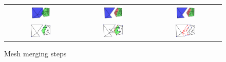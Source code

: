 \begin{figure}[t]
\begin{tabular}{ccc}
\includegraphics[width=0.3\textwidth]{./img/ch-incr-dens/meshmerge01}&
\includegraphics[width=0.3\textwidth]{./img/ch-incr-dens/meshmerge03}&
\includegraphics[width=0.3\textwidth]{./img/ch-incr-dens/meshmerge04}\\
\includegraphics[width=0.3\textwidth]{./img/ch-incr-dens/meshmerge07}&
\includegraphics[width=0.3\textwidth]{./img/ch-incr-dens/meshmerge09}&
\includegraphics[width=0.3\textwidth]{./img/ch-incr-dens/meshmerge11}
\end{tabular}
\label{fig:mesh_merging}
\caption{Mesh merging steps}
\end{figure}



